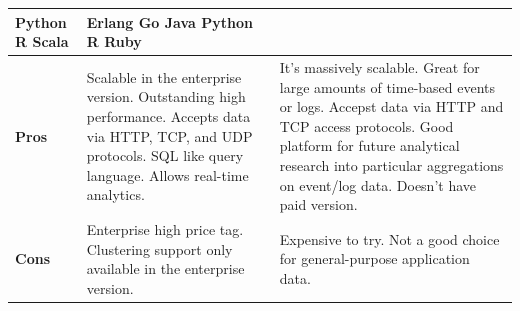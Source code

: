 \begin{table}[H]
\begin{tabularx}{\linewidth} {
        |>{\hsize=0.50\hsize}X|
        >{\hsize=1.25\hsize}X|
        >{\hsize=1.25\hsize}X| }
        Python \newline
        R \newline
        Scala
         & Erlang \newline
        Go \newline
        Java \newline
        Python \newline
        R \newline
        Ruby                                                                                                                                                                                                                                                                                                                      \\ \hline
        \textbf{Pros}
         & Scalable in the enterprise version. \newline
        Outstanding high performance. \newline
        Accepts data via HTTP, TCP, and UDP protocols. \newline
        SQL like query language. \newline
        Allows real-time analytics.
         & It's massively scalable. \newline
        Great for large amounts of time-based events or logs. \newline
        Accepst data via HTTP and TCP access protocols. \newline
        Good platform for future analytical research into particular aggregations on event/log data. \newline
        Doesn't have paid version.                                                                                                                                                                                                                                                                                                \\ \hline
        \textbf{Cons}
         & Enterprise high price tag. \newline
        Clustering support only available in the enterprise version.
         & Expensive to try. \newline
        Not a good choice for general-purpose application data.                                                                                                                                                                                                                                                                   \\ \hline
    \end{tabularx}
\end{table}

